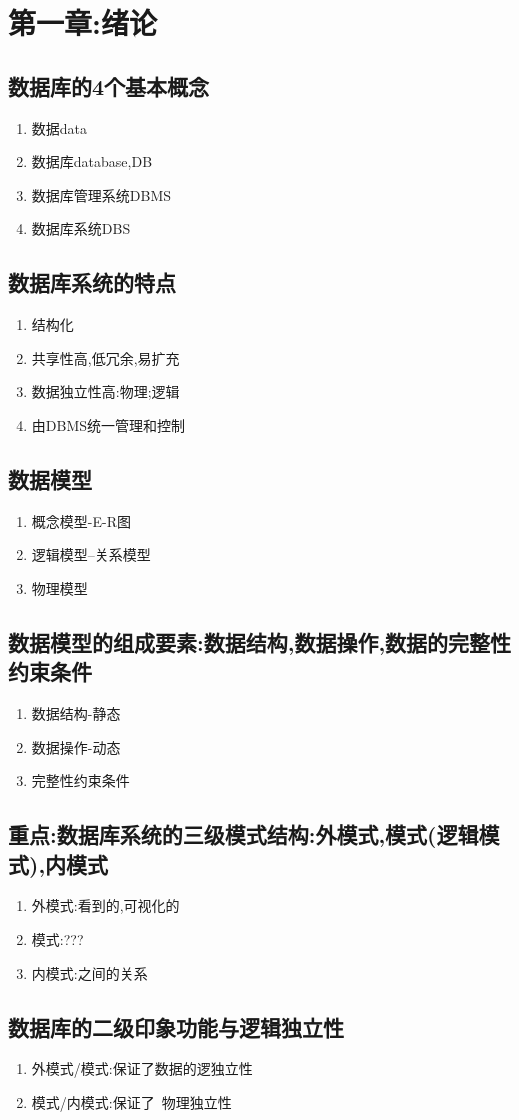 

\section{第一章:绪论}

\subsection{数据库的4个基本概念}
\begin{enumerate}
    \item 数据data
    \item 数据库database,DB
    \item 数据库管理系统DBMS
    \item 数据库系统DBS
\end{enumerate}
\subsection{数据库系统的特点}
\begin{enumerate}
    \item 结构化
    \item 共享性高,低冗余,易扩充
    \item 数据独立性高:物理;逻辑
    \item 由DBMS统一管理和控制
\end{enumerate}
\subsection{数据模型}
\begin{enumerate}
    \item 概念模型-E-R图
    \item 逻辑模型--关系模型
    \item 物理模型
\end{enumerate}
\subsection{数据模型的组成要素:数据结构,数据操作,数据的完整性约束条件}
\begin{enumerate}
    \item 数据结构-静态
    \item 数据操作-动态
    \item 完整性约束条件
\end{enumerate}
\subsection{\color{red}\textbf{重点:数据库系统的三级模式结构:外模式,模式(逻辑模式),内模式}}
\begin{enumerate}
    \item 外模式:看到的,可视化的
    \item 模式:???
    \item 内模式:之间的关系
\end{enumerate}
\subsection{数据库的二级印象功能与逻辑独立性}
\begin{enumerate}
    \item 外模式/模式:保证了数据的逻独立性
    \item 模式/内模式:保证了~物理独立性
\end{enumerate}
